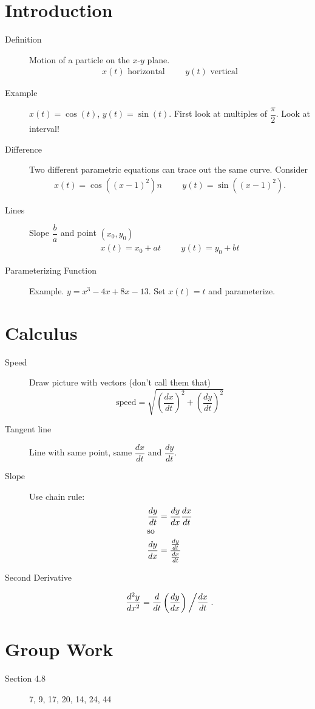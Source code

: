 \documentclass[11pt]{article}
\begin{document}
\drawtitle

\section*{Introduction}
\begin{description}
\item[Definition] Motion of a particle on the $x$-$y$ plane.
  \begin{align*}
    x(t)\mbox{ horizontal} &&& y(t)\mbox{ vertical}
  \end{align*}
\item[Example] $x(t)=\cos(t)$, $y(t)=\sin(t)$.  First look at
  multiples of $\dfrac{\pi}{2}$.  Look at interval!
\item[Difference] Two different parametric equations can trace out the
  same curve.  Consider
  \begin{align*}
    x(t)=\cos\left((x-1)^2\right)n &&&  y(t)=\sin\left((x-1)^2\right).
  \end{align*}
\item[Lines] Slope $\dfrac{b}{a}$ and point $(x_0,y_0)$
  \begin{align*}
    x(t)=x_0+at &&& y(t)=y_0+bt
  \end{align*}
\item[Parameterizing Function] Example. $y=x^3-4x+8x-13$.  Set
  $x(t)=t$ and parameterize.
\end{description}

\section*{Calculus}

\begin{description}
\item[Speed] Draw picture with vectors (don't call them that)
  \[
  \mbox{speed} = \sqrt{\left(\frac{dx}{dt}\right)^2 +
    \left(\frac{dy}{dt}\right)^2}
  \]
\item[Tangent line] Line with same point, same $\dfrac{dx}{dt}$ and
  $\dfrac{dy}{dt}$.
\item[Slope] Use chain rule:
  \begin{align*}
    \frac{dy}{dt} &=\frac{dy}{dx}\frac{dx}{dt}\\
    \intertext{so}
    \frac{dy}{dx} &=\frac{\frac{dy}{dt}}{\frac{dx}{dt}}
  \end{align*}
\item[Second Derivative]
  \[ \frac{d^2y}{dx^2} = \frac{d}{dt} \left(\frac{dy}{dx}\right)
  \left/\frac{dx}{dt}\right..
  \]
\end{description}

\section*{Group Work}
\begin{description}
\item[Section 4.8] 7, 9, 17, 20, 14, 24, 44
\end{description}
\end{document}
